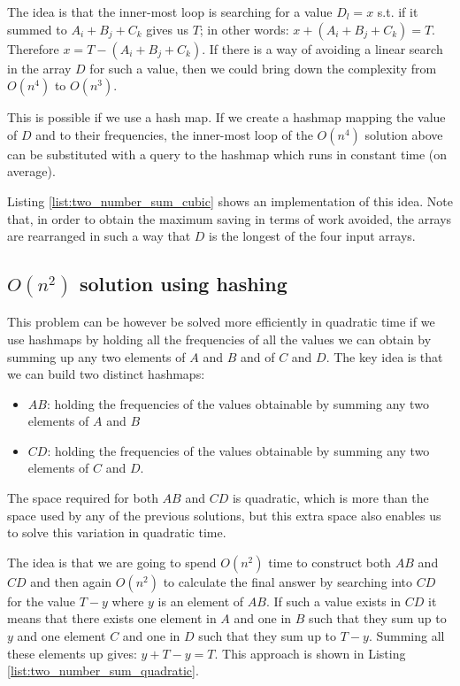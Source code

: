 The idea is that the inner-most loop is searching for a value $D_l = x$  s.t. if it summed to $A_i+B_j+C_k$ gives us $T$; in other words: $x+(A_i+B_j+C_k)=T$.
Therefore $x = T-(A_i+B_j+C_k)$. If there is a way of avoiding a linear search in the array $D$ for such a value, then we could bring down the complexity from $O(n^4)$ to $O(n^3)$.

This is possible if we use a hash map. If we create a hashmap mapping the value of $D$ and to their frequencies, the inner-most loop of the $O(n^4)$ solution above can be substituted with a query to the hashmap which runs in constant time (on average). 

Listing \ref{list:two_number_sum_cubic} shows an implementation of this idea. 
Note that, in order to obtain the maximum saving in terms of work avoided, the arrays are rearranged in such a way that $D$ is the longest of the four input arrays. 




\subsection{$O(n^2)$ solution using hashing}

This problem can be however be solved  more efficiently in quadratic time if we use hashmaps by holding all  
the frequencies of all the values we can obtain by summing up any two elements of $A$ and $B$ and of $C$ and $D$.
The key idea is that we can build two distinct hashmaps:
\begin{itemize}
	\item $AB$: holding the frequencies of the values obtainable by summing any two elements of $A$ and $B$
	\item $CD$: holding the frequencies of the values obtainable by summing any two elements of $C$ and $D$.
\end{itemize}

The space required for both $AB$ and $CD$ is quadratic, which is more than the space used by any of the previous solutions, but this extra space
also enables us to solve this variation in quadratic time. 

The idea is that we are going to spend $O(n^2)$ time to construct both $AB$ and $CD$
and then again $O(n^2)$ to calculate the final answer 
by searching into $CD$ for the value $T-y$ where $y$ is an element of $AB$. 
If such a value exists in $CD$ it means that there exists one element in  $A$ and one in $B$ such that they sum up to $y$ and
one element $C$ and one in $D$ such that they sum up to $T-y$. Summing all these elements up gives: $y+T-y = T$.
This approach is shown in Listing \ref{list:two_number_sum_quadratic}. 

